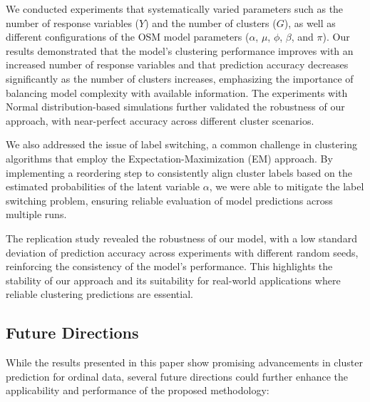 \documentclass{article}
\begin{document}
We conducted experiments that systematically varied parameters such as the number of response variables (\( Y \)) and the number of clusters (\( G \)), as well as different configurations of the OSM model parameters (\(\alpha\), \(\mu\), \(\phi\), \(\beta\), and \(\pi\)). Our results demonstrated that the model's clustering performance improves with an increased number of response variables and that prediction accuracy decreases significantly as the number of clusters increases, emphasizing the importance of balancing model complexity with available information. The experiments with Normal distribution-based simulations further validated the robustness of our approach, with near-perfect accuracy across different cluster scenarios.

We also addressed the issue of label switching, a common challenge in clustering algorithms that employ the Expectation-Maximization (EM) approach. By implementing a reordering step to consistently align cluster labels based on the estimated probabilities of the latent variable \(\alpha\), we were able to mitigate the label switching problem, ensuring reliable evaluation of model predictions across multiple runs.

The replication study revealed the robustness of our model, with a low standard deviation of prediction accuracy across experiments with different random seeds, reinforcing the consistency of the model's performance. This highlights the stability of our approach and its suitability for real-world applications where reliable clustering predictions are essential.

\subsection{Future Directions}

While the results presented in this paper show promising advancements in cluster prediction for ordinal data, several future directions could further enhance the applicability and performance of the proposed methodology:
\end{document}
